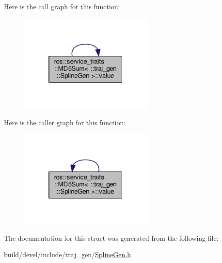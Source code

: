 Here is the call graph for this function\+:
\nopagebreak
\begin{figure}[H]
\begin{center}
\leavevmode
\includegraphics[width=193pt]{structros_1_1service__traits_1_1_m_d5_sum_3_01_1_1traj__gen_1_1_spline_gen_01_4_a02f3eb96e86e797da63ac00cd8726cf5_cgraph}
\end{center}
\end{figure}




Here is the caller graph for this function\+:
\nopagebreak
\begin{figure}[H]
\begin{center}
\leavevmode
\includegraphics[width=193pt]{structros_1_1service__traits_1_1_m_d5_sum_3_01_1_1traj__gen_1_1_spline_gen_01_4_a02f3eb96e86e797da63ac00cd8726cf5_icgraph}
\end{center}
\end{figure}




The documentation for this struct was generated from the following file\+:\begin{DoxyCompactItemize}
\item 
build/devel/include/traj\+\_\+gen/\hyperlink{_spline_gen_8h}{Spline\+Gen.\+h}\end{DoxyCompactItemize}
